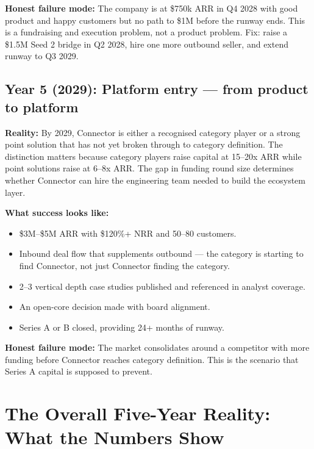 \textbf{Honest failure mode:} The company is at \$750k ARR in Q4 2028 with
good product and happy customers but no path to \$1M before the runway ends.
This is a fundraising and execution problem, not a product problem. Fix: raise
a \$1.5M Seed 2 bridge in Q2 2028, hire one more outbound seller, and extend
runway to Q3 2029.

\subsection{Year 5 (2029): Platform entry --- from product to platform}

\textbf{Reality:} By 2029, Connector is either a recognised category player or
a strong point solution that has not yet broken through to category definition.
The distinction matters because category players raise capital at 15--20x ARR
while point solutions raise at 6--8x ARR. The gap in funding round size
determines whether Connector can hire the engineering team needed to build the
ecosystem layer.

\textbf{What success looks like:}
\begin{itemize}[leftmargin=1.5em,itemsep=2pt]
  \item \$3M--\$5M ARR with \$120\%+ NRR and 50--80 customers.
  \item Inbound deal flow that supplements outbound — the category is starting
        to find Connector, not just Connector finding the category.
  \item 2--3 vertical depth case studies published and referenced in analyst
        coverage.
  \item An open-core decision made with board alignment.
  \item Series A or B closed, providing 24+ months of runway.
\end{itemize}

\textbf{Honest failure mode:} The market consolidates around a competitor
with more funding before Connector reaches category definition. This is the
scenario that Series A capital is supposed to prevent.

\section{The Overall Five-Year Reality: What the Numbers Show}

